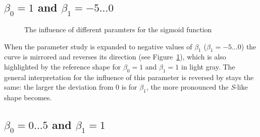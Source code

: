 \documentclass[
  a4paper,
]{scrbook}
\begin{document}
\newpage{}

\subsection{\texorpdfstring{\(\beta_0 = 1\) and
\(\beta_1 = -5 \ldots 0\)}{\textbackslash beta\_0 = 1 and \textbackslash beta\_1 = -5 \textbackslash ldots 0}}\label{beta_0-1-and-beta_1--5-ldots-0}

\begin{figure}[H]


\caption{\label{fig-sigmoid-params03}The influence of different
paramters for the sigmoid function}

\end{figure}%

When the parameter study is expanded to negative values of \(\beta_1\)
(\(\beta_1 = -5 \ldots 0\)) the curve is mirrored and reverses its
direction (see Figure~\ref{fig-sigmoid-params03}), which is also
highlighted by the reference shape for \(\beta_0 = 1\) and
\(\beta_1 = 1\) in light gray. The general interpretation for the
influence of this parameter is reversed by stays the same: the larger
the deviation from \(0\) is for \(\beta_1\), the more pronounced the
\emph{S}-like shape becomes.

\newpage{}

\subsection{\texorpdfstring{\(\beta_0 = 0\ldots 5\) and
\(\beta_1 = 1\)}{\textbackslash beta\_0 = 0\textbackslash ldots 5 and \textbackslash beta\_1 = 1}}\label{beta_0-0ldots-5-and-beta_1-1}
\end{document}
